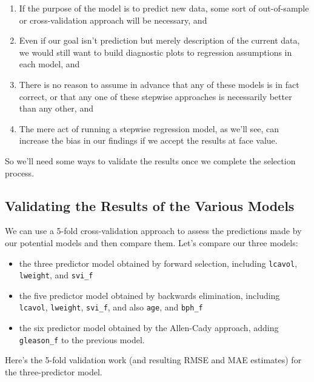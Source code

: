 \documentclass[]{book}
\providecommand{\tightlist}{%
  \setlength{\itemsep}{0pt}\setlength{\parskip}{0pt}}
\theoremstyle{definition}
\theoremstyle{definition}
\theoremstyle{definition}
\theoremstyle{remark}
\begin{document}
\begin{enumerate}
\def\labelenumi{\arabic{enumi}.}
\tightlist
\item
  If the purpose of the model is to predict new data, some sort of
  out-of-sample or cross-validation approach will be necessary, and
\item
  Even if our goal isn't prediction but merely description of the
  current data, we would still want to build diagnostic plots to
  regression assumptions in each model, and
\item
  There is no reason to assume in advance that any of these models is in
  fact correct, or that any one of these stepwise approaches is
  necessarily better than any other, and
\item
  The mere act of running a stepwise regression model, as we'll see, can
  increase the bias in our findings if we accept the results at face
  value.
\end{enumerate}

So we'll need some ways to validate the results once we complete the
selection process.

\subsection{Validating the Results of the Various
Models}\label{validating-the-results-of-the-various-models}

We can use a 5-fold cross-validation approach to assess the predictions
made by our potential models and then compare them. Let's compare our
three models:

\begin{itemize}
\tightlist
\item
  the three predictor model obtained by forward selection, including
  \texttt{lcavol}, \texttt{lweight}, and \texttt{svi\_f}
\item
  the five predictor model obtained by backwards elimination, including
  \texttt{lcavol}, \texttt{lweight}, \texttt{svi\_f}, and also
  \texttt{age}, and \texttt{bph\_f}
\item
  the six predictor model obtained by the Allen-Cady approach, adding
  \texttt{gleason\_f} to the previous model.
\end{itemize}

Here's the 5-fold validation work (and resulting RMSE and MAE estimates)
for the three-predictor model.
\end{document}
